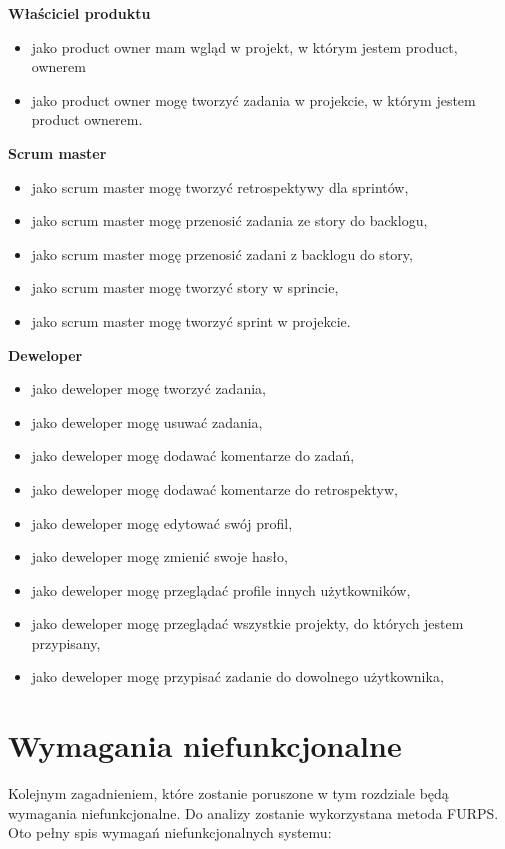 \textbf{Właściciel produktu}
\begin{itemize}	
	\item jako product owner mam wgląd w projekt, w którym jestem product, ownerem	
	\item jako product owner mogę tworzyć zadania w projekcie, w którym jestem product ownerem.
\end{itemize}	
\textbf{Scrum master}
\begin{itemize}		
	\item jako scrum master mogę tworzyć retrospektywy dla sprintów,
	\item jako scrum master mogę przenosić zadania ze story do backlogu,
	\item jako scrum master mogę przenosić zadani z backlogu do story,
	\item jako scrum master mogę tworzyć story w sprincie,
	\item jako scrum master mogę tworzyć sprint w projekcie.
\end{itemize}
\textbf{Deweloper}
\begin{itemize}		
	\item jako deweloper mogę tworzyć zadania,
	\item jako deweloper mogę usuwać zadania,
	\item jako deweloper mogę dodawać komentarze do zadań,
	\item jako deweloper mogę dodawać komentarze do retrospektyw,
	\item jako deweloper mogę edytować swój profil,
	\item jako deweloper mogę zmienić swoje hasło,
	\item jako deweloper mogę przeglądać profile innych użytkowników,
	\item jako deweloper mogę przeglądać wszystkie projekty, do których jestem przypisany,
	\item jako deweloper mogę przypisać zadanie do dowolnego użytkownika,
	
\end{itemize}

\section{Wymagania niefunkcjonalne}
Kolejnym zagadnieniem, które zostanie poruszone w tym rozdziale będą wymagania niefunkcjonalne. Do analizy zostanie wykorzystana metoda FURPS. Oto pełny spis wymagań niefunkcjonalnych systemu:

